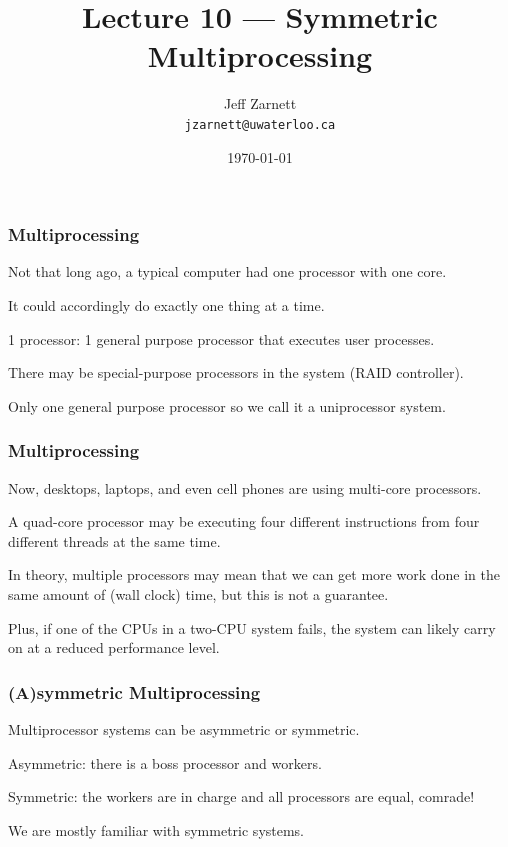 

\title{Lecture 10 --- Symmetric Multiprocessing }

\author{Jeff Zarnett \\ \small \texttt{jzarnett@uwaterloo.ca}}
\date{\today}




\begin{frame}
  \titlepage

 \end{frame}

 
\begin{frame}
\frametitle{Multiprocessing}

Not that long ago, a typical computer had one processor with one core. 

It could accordingly do exactly one thing at a time. 

1 processor: 1 general purpose processor that executes user processes. 

There may be special-purpose processors in the system (RAID controller). 

Only one general purpose processor so we call it a uniprocessor system.



\end{frame}

 
\begin{frame}
\frametitle{Multiprocessing}

Now, desktops, laptops, and even cell phones are using multi-core processors.

A quad-core processor may be executing four different instructions from four different threads at the same time. 

In theory, multiple processors may mean that we can get more work done in the same amount of (wall clock) time, but this is not a guarantee. 

Plus, if one of the CPUs in a two-CPU system fails, the system can likely carry on at a reduced performance level.

\end{frame}

 
\begin{frame}
\frametitle{(A)symmetric Multiprocessing}

Multiprocessor systems can be \alert{asymmetric} or \alert{symmetric}.

Asymmetric: there is a \alert{boss} processor and \alert{workers}.

Symmetric: the workers are in charge and all processors are equal, comrade!

We are mostly familiar with symmetric systems.

\end{frame}

